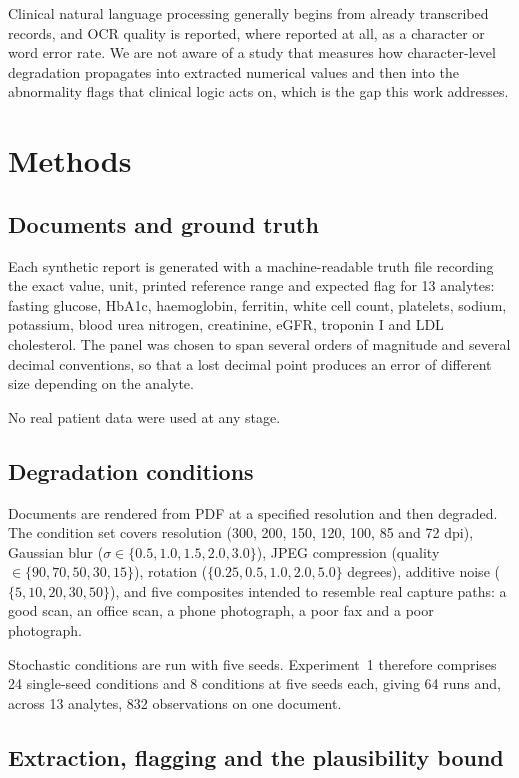 \documentclass[11pt]{article}
\begin{document}
Clinical natural language processing generally begins from already transcribed records, and
OCR quality is reported, where reported at all, as a character or word error rate.
We are not aware of a study that measures how character-level degradation propagates into
extracted numerical values and then into the abnormality flags that clinical logic acts on,
which is the gap this work addresses.

\section{Methods}

\subsection{Documents and ground truth}

Each synthetic report is generated with a machine-readable truth file recording the exact value,
unit, printed reference range and expected flag for 13 analytes: fasting glucose, HbA1c,
haemoglobin, ferritin, white cell count, platelets, sodium, potassium, blood urea nitrogen,
creatinine, eGFR, troponin I and LDL cholesterol. The panel was chosen to span several orders of
magnitude and several decimal conventions, so that a lost decimal point produces an error of
different size depending on the analyte.

No real patient data were used at any stage.

\subsection{Degradation conditions}

Documents are rendered from PDF at a specified resolution and then degraded. The condition set
covers resolution (300, 200, 150, 120, 100, 85 and 72 dpi), Gaussian blur
($\sigma \in \{0.5, 1.0, 1.5, 2.0, 3.0\}$), JPEG compression (quality
$\in \{90, 70, 50, 30, 15\}$), rotation ($\{0.25, 0.5, 1.0, 2.0, 5.0\}$ degrees), additive
noise ($\{5, 10, 20, 30, 50\}$), and five composites intended to resemble real capture paths:
a good scan, an office scan, a phone photograph, a poor fax and a poor photograph.

Stochastic conditions are run with five seeds. Experiment~1 therefore comprises 24
single-seed conditions and 8 conditions at five seeds each, giving 64 runs and, across 13
analytes, 832 observations on one document.

\subsection{Extraction, flagging and the plausibility bound}
\end{document}
